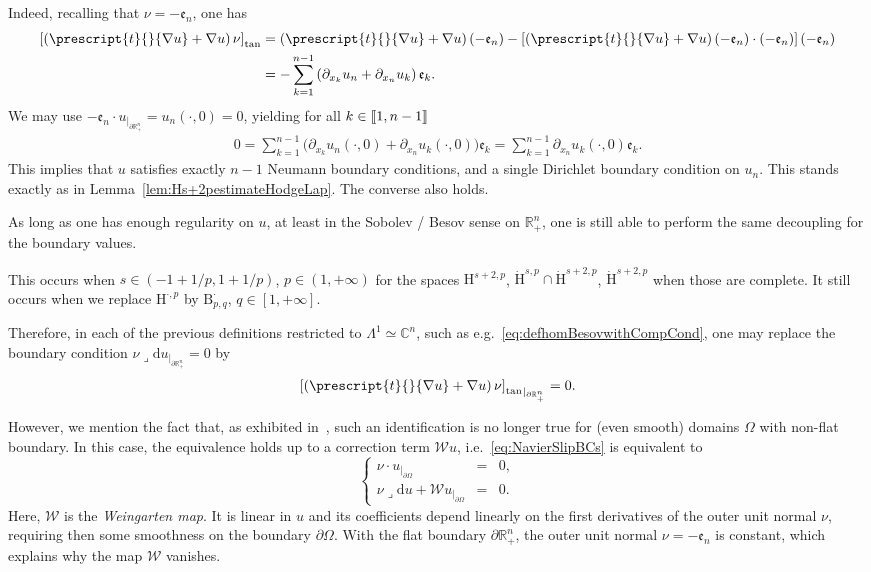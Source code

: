 \documentclass[10pt]{amsart}
\theoremstyle{definition}\newtheorem{defi}[theo]{Definition}\newtheorem{rema}[theo]{Remark}\newtheorem{exam}[theo]{Example}\newtheorem{exem}[theo]{Example}\newtheorem{nota}[theo]{Notation}
\newcommand{\bbR}{\mathbb{R}}
\newcommand{\bbC}{\mathbb{C}}
\newcommand{\rmH}{\mathrm{H}}%
\newcommand{\rmB}{\mathrm{B}}
\newcommand{\rmd}{\mathrm{d}}
\newcommand{\rtan}{\mathrm{tan}}
\newcommand{\fke}{\mathfrak{e}}
\newcommand{\llbracket}{\mathopen{[\mkern -2.7mu[}}
\newcommand{\rrbracket}{\mathclose{]\mkern -2.7mu]}}
\newcommand{\llb}{\llbracket}
\newcommand{\rrb}{\rrbracket}
\newcommand{\iprod}{\mathbin{\lrcorner}}
\begin{document}
Indeed, recalling that $\nu = -\fke _n$, one has
\begin{align*}
{\left[ \left(\prescript{t}{}{{\nabla u}} + \nabla u\right)\nu \right]_{\rtan}} &= \left(\prescript{t}{}{{\nabla u}} + \nabla u\right)(-\fke _n) - \left[\left(\prescript{t}{}{{\nabla u}} + \nabla u\right)(-\fke _n)\cdot (-\fke _n)\right](-\fke _n)\\
&= -\sum_{k=1}^{n-1} \left(\partial_{x_k}u_n + \partial_{x_n}u_k\right)\fke _k.
\end{align*}
We may use $ -\fke _n \cdot u_{|_{\partial\bbR^n_+}} = u_n(\cdot,0) = 0$, yielding for all $k\in\llb 1,n-1\rrb$
\begin{align*}
0=\sum_{k=1}^{n-1} \big(\partial_{x_k}u_n(\cdot,0) + \partial_{x_n}u_k(\cdot,0)\big)\fke _k = \sum_{k=1}^{n-1} \partial_{x_n}u_k(\cdot,0)\fke _k .
\end{align*}
This implies that $u$ satisfies exactly $n-1$ Neumann boundary conditions, and a single Dirichlet boundary condition on $u_n$. This stands exactly as in Lemma~\ref{lem:Hs+2pestimateHodgeLap}. The converse also holds.

As long as one has enough regularity on $u$, at least in the Sobolev / Besov sense on $\bbR^n_+$, one is still able to perform the same decoupling for the boundary values.

This occurs when $s\in(-1+1/p,1+1/p)$, $p\in(1,+\infty)$ for the spaces $\rmH^{s+2,p}$, $\dot{\rmH}^{s,p}\cap\dot{\rmH}^{s+2,p}$, $\dot{\rmH}^{s+2,p}$ when those are complete. It still occurs when we replace ${\rmH}^{\cdot,p}$ by ${\rmB}^{\cdot}_{p,q}$, $q\in[1,+\infty]$.

Therefore, in each of the previous definitions restricted to $\Lambda^1\simeq\bbC^n$, such as e.g.~\eqref{eq:defhomBesovwithCompCond}, one may replace the boundary condition $\nu\iprod \rmd u_{|_{\partial\bbR^n_+}} =0$ by
\[
{\left[\left(\prescript{t}{}{{\nabla u}} + \nabla u\right)\nu \right]_{\rtan}}_{|_{\partial\bbR^n_+}}=0.
\]

However, we mention the fact that, as exhibited in~\cite[Section~2]{MitreaMonniaux2009-1}, such an identification is no longer true for (even smooth) domains $\Omega$ with non-flat boundary. In this case, the equivalence holds up to a correction term $\mathcal{W}u$, i.e.~\eqref{eq:NavierSlipBCs} is equivalent to
\begin{equation*}
\left\{
\begin{array}{rcl}
\nu \cdot u_{|_{\partial\Omega}}& = & 0,\\
\nu \iprod \rmd u + \mathcal{W}u_{|_{\partial\Omega}} & = & 0.
\end{array}
\right.
\end{equation*}
Here, $\mathcal{W}$ is the \emph{Weingarten map}. It is linear in $u$ and its coefficients depend linearly on the first derivatives of the outer unit normal $\nu$, requiring then some smoothness on the boundary $\partial\Omega$. With the flat boundary $\partial\bbR^n_+$, the outer unit normal $\nu=-\fke _n$ is constant, which explains why the map $\mathcal{W}$ vanishes.
\end{document}
